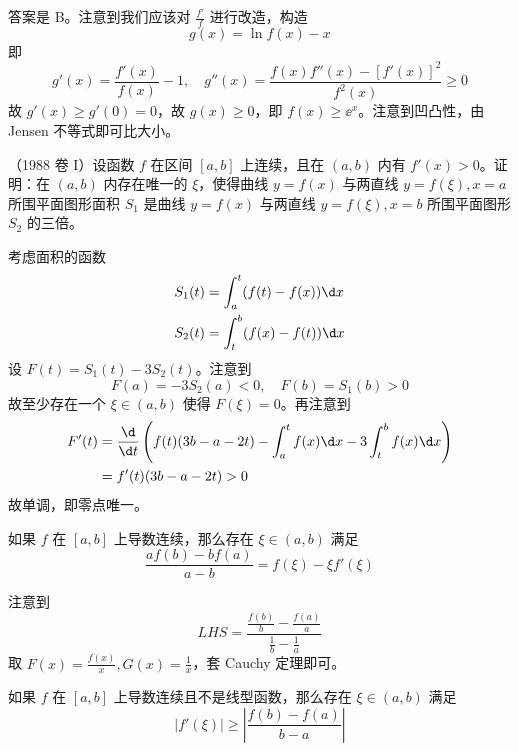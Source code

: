 \begin{solution}
	答案是 B。注意到我们应该对 $\frac{f'}{f}$ 进行改造，构造
	\[ g(x) = \ln f(x) - x \]
	即
	\[ g'(x) = \frac{f'(x)}{f(x)} - 1, \quad g''(x) = \frac{f(x) f''(x) - [f'(x)]^2}{f^2(x)} \geqslant 0 \]
	故 $g'(x) \geqslant g'(0) = 0$，故 $g(x) \geqslant 0$，即 $f(x) \geqslant \ee^x$。注意到凹凸性，由 Jensen 不等式即可比大小。
\end{solution}

\begin{problem}[000032]
（1988 卷 I）设函数 $f$ 在区间 $[a, b]$ 上连续，且在 $(a, b)$ 内有 $f'(x) > 0$。证明：在 $(a, b)$ 内存在唯一的 $\xi$，使得曲线 $y = f(x)$ 与两直线 $y = f(\xi), x = a$ 所围平面图形面积 $S_1$ 是曲线 $y = f(x)$ 与两直线 $y = f(\xi), x = b$ 所围平面图形 $S_2$ 的三倍。
\end{problem}

\begin{solution}
	考虑面积的函数
	\[  \begin{aligned}
			S_1(t) & = \int_{a}^{t} (f(t) - f(x)) \d x \\
			S_2(t) & = \int_{t}^{b} (f(x) - f(t)) \d x
		\end{aligned} \]
	设 $F(t) = S_1(t) - 3S_2(t)$。注意到
	\[ F(a) = -3S_2(a) < 0, \quad F(b) = S_1(b) > 0 \]
	故至少存在一个 $\xi \in (a, b)$ 使得 $F(\xi) = 0$。再注意到
	\[ \begin{aligned}
			F'(t)
			 & = \frac{\d}{\d t}\left( f(t)(3b - a - 2t) - \int_{a}^{t} f(x) \d x - 3 \int_{t}^{b} f(x) \d x \right) \\
			 & = f'(t) (3b - a - 2t) > 0
		\end{aligned} \]
	故单调，即零点唯一。
\end{solution}

\begin{problem}[000033]
如果 $f$ 在 $[a, b]$ 上导数连续，那么存在 $\xi \in (a, b)$ 满足
\[ \frac{af(b) - bf(a)}{a - b} = f(\xi) - \xi f'(\xi) \]
\end{problem}

\begin{solution}
	注意到
	\[ LHS = \frac{\frac{f(b)}{b} - \frac{f(a)}{a}}{\frac{1}{b} - \frac{1}{a}} \]
	取 $F(x) = \frac{f(x)}{x}, G(x) = \frac{1}{x}$，套 Cauchy 定理即可。
\end{solution}

\begin{problem}[000034]
如果 $f$ 在 $[a, b]$ 上导数连续且不是线型函数，那么存在 $\xi \in (a, b)$ 满足
\[ |f'(\xi)| \geqslant \left| \frac{f(b) - f(a)}{b - a} \right| \]
\end{problem}

